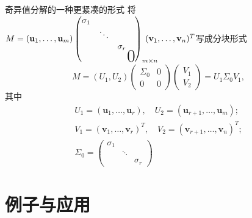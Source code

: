 
\begin{frame}

\begin{block}{奇异值分解的一种更紧凑的形式}
将$M = (\mathbf{u}_1,\ldots,\mathbf{u}_m) \begin{pmatrix}
\sigma_1 & & & \\ & \ddots & & \\ & & \sigma_r & \\ & & & \bigzero \end{pmatrix}_{m\times n}\!\!\!\!\!\!\!\!\!\!(\mathbf{v}_1,\ldots,\mathbf{v}_n)^T$写成分块形式
$$M = (U_1, U_2) \begin{pmatrix} \Sigma_0 & 0 \\ 0 & 0 \end{pmatrix} \begin{pmatrix} V_1 \\ V_2 \end{pmatrix} = U_1\Sigma_0V_1,$$
其中
\begin{gather*}
U_1 = (\mathbf{u}_1,\ldots,\mathbf{u}_r), \quad U_2 = (\mathbf{u}_{r+1},\ldots,\mathbf{u}_m); \\
V_1 = (\mathbf{v}_1,\ldots,\mathbf{v}_r)^T, \quad V_2 = (\mathbf{v}_{r+1},\ldots,\mathbf{v}_n)^T; \\
\Sigma_0 = \begin{pmatrix}
\sigma_1 & & \\ & \ddots & \\ & & \sigma_r \end{pmatrix}
\end{gather*}

\end{block}

\end{frame}


\section{例子与应用}


